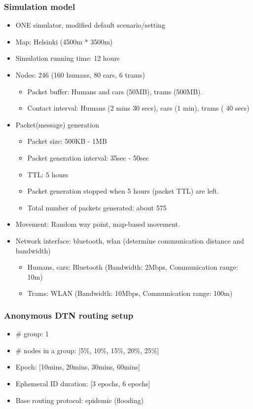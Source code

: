 \documentclass[11pt]{article}
\begin{document}
\subsubsection{Simulation model}
\begin{itemize}
 \item ONE simulator, modified default scenario/setting

 \item Map: Helsinki (4500m * 3500m)

 \item Simulation running time: 12 hours

 \item Nodes: 246 (160 humans, 80 cars, 6 trams)
  \begin{itemize}
   \item Packet buffer: Humans and cars (50MB), trams (500MB).
   \item Contact interval: Humans (2 mins 30 secs), cars (1 min), trams ( 40 secs)
  \end{itemize}

 \item Packet(message) generation
  \begin{itemize}
   \item Packet size: 500KB - 1MB
   \item Packet generation interval: 35sec - 50sec
   \item TTL: 5 hours
   \item Packet generation stopped when 5 hours (packet TTL) are left.   
   \item Total number of packets generated: about 575
  \end{itemize}

 \item Movement: Random way point, map-based movement.

 \item Network interface: bluetooth, wlan (determine communication distance and bandwidth)
  \begin{itemize}
   \item Humans, cars: Bluetooth (Bandwidth: 2Mbps, Communication range: 10m)
   \item Trams: WLAN (Bandwidth: 10Mbps, Communication range: 100m)
  \end{itemize}

\end{itemize}



\subsubsection{Anonymous DTN routing setup}
\begin{itemize}
 \item \# group: 1
 \item \# nodes in a group: [5\%, 10\%, 15\%, 20\%, 25\%]
 \item Epoch: [10mins, 20mins, 30mins, 60mins]
 \item Ephemeral ID duration: [3 epochs, 6 epochs]
 \item Base routing protocol: epidemic (flooding)
\end{itemize}
\end{document}
